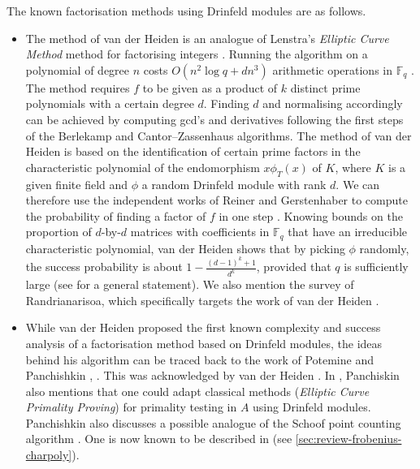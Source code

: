 \documentclass[11pt]{article}
\theoremstyle{definition}
\newcommand\Fq{\mathbb{F}_q}
\begin{document}
The known factorisation methods using Drinfeld modules are as follows.
\begin{itemize}
  
  \item The method of van der Heiden \cite{van_der_heiden_factoring_2004,
    van_der_heiden_addendum_2004} is an analogue of Lenstra's \emph{Elliptic Curve Method} method for factorising integers \cite{lenstra_factoring_1987}.
    Running the algorithm on a polynomial of degree $n$ costs $O(n^2 \log q +
    dn^3)$ arithmetic operations in $\Fq$
    \cite[Proposition~4.3]{van_der_heiden_factoring_2004}. The method requires
    $f$ to be given as a product of $k$ distinct prime polynomials with a
    certain degree $d$. Finding $d$ and normalising accordingly can be
    achieved by computing gcd's and derivatives following the first steps of
    the Berlekamp \cite{berlekamp_factoring_1967} and Cantor--Zassenhaus
    \cite{cantor_new_1981} algorithms. The method of van der Heiden is based on the identification of certain prime factors in the characteristic polynomial
    of the endomorphism $x \phi_T(x)$ of $K$, where $K$ is a given finite field
    and $\phi$ a random Drinfeld module with rank $d$. We can therefore use the
    independent works of Reiner \cite{reiner_number_1961} and Gerstenhaber
    \cite{gerstenhaber_number_1961} to compute the probability of finding a
    factor of $f$ in one step \cite[Remark~4.5]{van_der_heiden_factoring_2004}. Knowing bounds on the proportion of
    $d$-by-$d$ matrices with coefficients in $\Fq$ that have an irreducible
    characteristic polynomial, van der Heiden shows that by picking $\phi$
    randomly, the success probability is about $1 - \frac{(d-1)^k + 1}{d^k}$,
    provided that $q$ is sufficiently large (see
    \cite[Proposition~4.3]{van_der_heiden_factoring_2004} for a general
    statement). We also mention the survey of Randrianarisoa, which specifically targets the work of van der Heiden
    \cite{randrianarisoa_number_2014}.

  \item While van der Heiden proposed the first known complexity and success analysis of a factorisation method based on Drinfeld modules, the ideas behind his algorithm can be traced back to the work of Potemine and
    Panchishkin \cite[Section~4.3]{potemine_arithmetique_1997},
    \cite{panchishkin_algorithmes_1993}. This was acknowledged by van der
    Heiden \cite{van_der_heiden_addendum_2004}. In
    \cite{panchishkin_algorithmes_1993}, Panchiskin also mentions that one
    could adapt classical methods (\emph{Elliptic Curve Primality Proving}) for
    primality testing in $A$ using Drinfeld modules. Panchishkin also discusses
    a possible analogue of the Schoof point counting algorithm
    \cite{schoof_elliptic_1985}. One is now known to be described in
    \cite[Section~6]{musleh_computing_2019} (see \cref{sec:review-frobenius-charpoly}).


\end{itemize}
\end{document}
